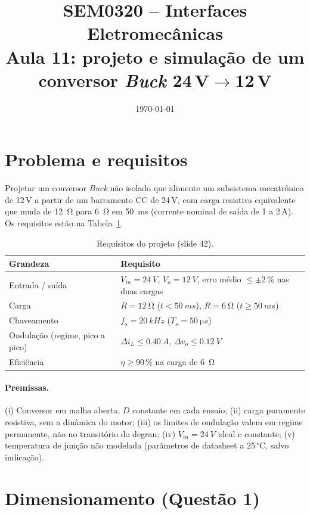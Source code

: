 \documentclass[11pt,a4paper]{article}
\title{SEM0320 -- Interfaces Eletromec\^anicas\\
\large Aula 11: projeto e simula\c{c}\~ao de um conversor \emph{Buck} 24\,V$\to$12\,V}
\author{\TODO{nome e n.\textordmasculine\ USP}}
\date{\today}
\newcommand{\fs}{f_s}
\newcommand{\Vin}{V_{in}}
\newcommand{\Vo}{V_o}
\newcommand{\dIL}{\Delta i_L}
\newcommand{\dvo}{\Delta v_o}
\begin{document}
\maketitle

\section{Problema e requisitos}
Projetar um conversor \emph{Buck} n\~ao isolado que alimente um subsistema mecatr\^onico de 12\,V a partir de um barramento CC de 24\,V, com carga resistiva equivalente que muda de \SI{12}{\ohm} para \SI{6}{\ohm} em \SI{50}{ms} (corrente nominal de sa\'ida de 1 a 2\,A). Os requisitos est\~ao na Tabela~\ref{tab:req}.

\begin{table}[h]
\centering
\caption{Requisitos do projeto (slide 42).}
\label{tab:req}
\begin{tabular}{@{}ll@{}}
\toprule
Grandeza & Requisito \\ \midrule
Entrada / sa\'ida & $\Vin=\SI{24}{V}$, $\Vo=\SI{12}{V}$, erro m\'edio $\le \pm 2\,\%$ nas duas cargas \\
Carga & $R=\SI{12}{\ohm}$ ($t<\SI{50}{ms}$), $R=\SI{6}{\ohm}$ ($t\ge\SI{50}{ms}$) \\
Chaveamento & $\fs=\SI{20}{kHz}$ ($T_s=\SI{50}{\micro s}$) \\
Ondula\c{c}\~ao (regime, pico a pico) & $\dIL\le\SI{0,40}{A}$, $\dvo\le\SI{0,12}{V}$ \\
Efici\^encia & $\eta\ge 90\,\%$ na carga de \SI{6}{\ohm} \\ \bottomrule
\end{tabular}
\end{table}

\paragraph{Premissas.} (i) Conversor em malha aberta, $D$ constante em cada ensaio; (ii) carga puramente resistiva, sem a din\^amica do motor; (iii) os limites de ondula\c{c}\~ao valem em regime permanente, n\~ao no transit\'orio do degrau; (iv) $\Vin=\SI{24}{V}$ ideal e constante; (v) temperatura de jun\c{c}\~ao n\~ao modelada (par\^ametros de datasheet a 25\,$^\circ$C, salvo indica\c{c}\~ao).

\section{Dimensionamento (Quest\~ao 1)}
\end{document}

